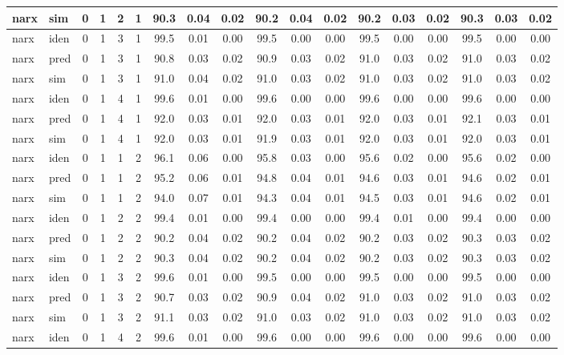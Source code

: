\begin{landscape}
\begin{center}
\begin{longtable}{ll|cccc|ccc|ccc|ccc|ccc}
narx & sim  & 0 & 1 & 2 & 1 & 90.3 & 0.04 & 0.02 & 90.2 & 0.04 & 0.02 & 90.2 & 0.03 & 0.02 & 90.3 & 0.03 & 0.02 \\ 
 \hline 
narx & iden & 0 & 1 & 3 & 1 & 99.5 & 0.01 & 0.00 & 99.5 & 0.00 & 0.00 & 99.5 & 0.00 & 0.00 & 99.5 & 0.00 & 0.00 \\ 
narx & pred & 0 & 1 & 3 & 1 & 90.8 & 0.03 & 0.02 & 90.9 & 0.03 & 0.02 & 91.0 & 0.03 & 0.02 & 91.0 & 0.03 & 0.02 \\ 
narx & sim  & 0 & 1 & 3 & 1 & 91.0 & 0.04 & 0.02 & 91.0 & 0.03 & 0.02 & 91.0 & 0.03 & 0.02 & 91.0 & 0.03 & 0.02 \\ 
 \hline 
narx & iden & 0 & 1 & 4 & 1 & 99.6 & 0.01 & 0.00 & 99.6 & 0.00 & 0.00 & 99.6 & 0.00 & 0.00 & 99.6 & 0.00 & 0.00 \\ 
narx & pred & 0 & 1 & 4 & 1 & 92.0 & 0.03 & 0.01 & 92.0 & 0.03 & 0.01 & 92.0 & 0.03 & 0.01 & 92.1 & 0.03 & 0.01 \\ 
narx & sim  & 0 & 1 & 4 & 1 & 92.0 & 0.03 & 0.01 & 91.9 & 0.03 & 0.01 & 92.0 & 0.03 & 0.01 & 92.0 & 0.03 & 0.01 \\ 
 \hline 
narx & iden & 0 & 1 & 1 & 2 & 96.1 & 0.06 & 0.00 & 95.8 & 0.03 & 0.00 & 95.6 & 0.02 & 0.00 & 95.6 & 0.02 & 0.00 \\ 
narx & pred & 0 & 1 & 1 & 2 & 95.2 & 0.06 & 0.01 & 94.8 & 0.04 & 0.01 & 94.6 & 0.03 & 0.01 & 94.6 & 0.02 & 0.01 \\ 
narx & sim  & 0 & 1 & 1 & 2 & 94.0 & 0.07 & 0.01 & 94.3 & 0.04 & 0.01 & 94.5 & 0.03 & 0.01 & 94.6 & 0.02 & 0.01 \\ 
 \hline 
narx & iden & 0 & 1 & 2 & 2 & 99.4 & 0.01 & 0.00 & 99.4 & 0.00 & 0.00 & 99.4 & 0.01 & 0.00 & 99.4 & 0.00 & 0.00 \\ 
narx & pred & 0 & 1 & 2 & 2 & 90.2 & 0.04 & 0.02 & 90.2 & 0.04 & 0.02 & 90.2 & 0.03 & 0.02 & 90.3 & 0.03 & 0.02 \\ 
narx & sim  & 0 & 1 & 2 & 2 & 90.3 & 0.04 & 0.02 & 90.2 & 0.04 & 0.02 & 90.2 & 0.03 & 0.02 & 90.3 & 0.03 & 0.02 \\ 
 \hline 
narx & iden & 0 & 1 & 3 & 2 & 99.6 & 0.01 & 0.00 & 99.5 & 0.00 & 0.00 & 99.5 & 0.00 & 0.00 & 99.5 & 0.00 & 0.00 \\ 
narx & pred & 0 & 1 & 3 & 2 & 90.7 & 0.03 & 0.02 & 90.9 & 0.04 & 0.02 & 91.0 & 0.03 & 0.02 & 91.0 & 0.03 & 0.02 \\ 
narx & sim  & 0 & 1 & 3 & 2 & 91.1 & 0.03 & 0.02 & 91.0 & 0.03 & 0.02 & 91.0 & 0.03 & 0.02 & 91.0 & 0.03 & 0.02 \\ 
 \hline 
narx & iden & 0 & 1 & 4 & 2 & 99.6 & 0.01 & 0.00 & 99.6 & 0.00 & 0.00 & 99.6 & 0.00 & 0.00 & 99.6 & 0.00 & 0.00 \\ 

\end{longtable}
\end{center}
\end{landscape}
